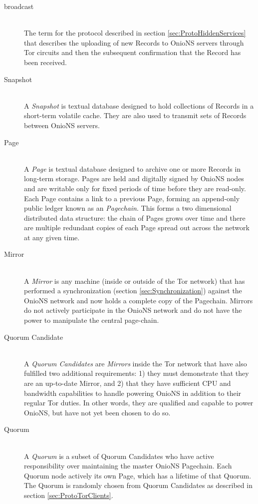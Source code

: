 \begin{description}
	\item[broadcast] \hfill \\
		The term for the protocol described in section \ref{sec:ProtoHiddenServices} that describes the uploading of new Records to OnioNS servers through Tor circuits and then the subsequent confirmation that the Record has been received.

	\item[Snapshot] \hfill \\
		A \emph{Snapshot} is textual database designed to hold collections of Records in a short-term volatile cache. They are also used to transmit sets of Records between OnioNS servers.

	\item[Page] \hfill \\
		A \emph{Page} is textual database designed to archive one or more Records in long-term storage. Pages are held and digitally signed by OnioNS nodes and are writable only for fixed periods of time before they are read-only. Each Page contains a link to a previous Page, forming an append-only public ledger known as an \emph{Pagechain}. This forms a two dimensional distributed data structure: the chain of Pages grows over time and there are multiple redundant copies of each Page spread out across the network at any given time.

	\item[Mirror] \hfill \\
		A \emph{Mirror} is any machine (inside or outside of the Tor network) that has performed a synchronization (section \ref{sec:Synchronization}) against the OnioNS network and now holds a complete copy of the Pagechain. Mirrors do not actively participate in the OnioNS network and do not have the power to manipulate the central page-chain.

	\item[Quorum Candidate] \hfill \\
		A \emph{Quorum Candidates} are \emph{Mirrors} inside the Tor network that have also fulfilled two additional requirements: 1) they must demonstrate that they are an up-to-date Mirror, and 2) that they have sufficient CPU and bandwidth capabilities to handle powering OnioNS in addition to their regular Tor duties. In other words, they are qualified and capable to power OnioNS, but have not yet been chosen to do so.

	\item[Quorum] \hfill \\
		A \emph{Quorum} is a subset of Quorum Candidates who have active responsibility over maintaining the master OnioNS Pagechain. Each Quorum node actively its own Page, which has a lifetime of that Quorum. The Quorum is randomly chosen from Quorum Candidates as described in section \ref{sec:ProtoTorClients}.


\end{description}
